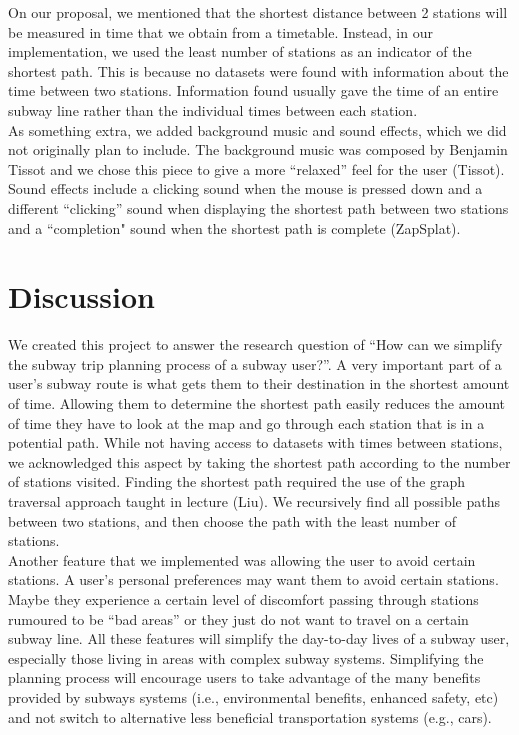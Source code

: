 \documentclass[fontsize=11pt]{article}
\begin{document}
On our proposal, we mentioned that the shortest distance between 2 stations will be measured in time that we obtain from a timetable. Instead, in our implementation, we used the least number of stations as an indicator of the shortest path. This is because no datasets were found with information about the time between two stations. Information found usually gave the time of an entire subway line rather than the individual times between each station. \\

As something extra, we added background music and sound effects, which we did not originally plan to include. The background music was composed by Benjamin Tissot and we chose this piece to give a more ``relaxed” feel for the user (Tissot). Sound effects include a clicking sound when the mouse is pressed down and a different ``clicking” sound when displaying the shortest path between two stations and a ``completion" sound when the shortest path is complete (ZapSplat).

\bigskip

\section*{Discussion} 

We created this project to answer the research question of “How can we simplify the subway trip planning process of a subway user?”. A very important part of a user’s subway route is what gets them to their destination in the shortest amount of time. Allowing them to determine the shortest path easily reduces the amount of time they have to look at the map and go through each station that is in a potential path. While not having access to datasets with times between stations, we acknowledged this aspect by taking the shortest path according to the number of stations visited. Finding the shortest path required the use of the graph traversal approach taught in lecture (Liu). We recursively find all possible paths between two stations, and then choose the path with the least number of stations.  \\

Another feature that we implemented was allowing the user to avoid certain stations. A user’s personal preferences may want them to avoid certain stations. Maybe they experience a certain level of discomfort passing through stations rumoured to be ``bad areas” or they just do not want to travel on a certain subway line.  All these features will simplify the day-to-day lives of a subway user, especially those living in areas with complex subway systems. Simplifying the planning process will encourage users to take advantage of the many benefits provided by subways systems (i.e., environmental benefits, enhanced safety, etc) and not switch to alternative less beneficial transportation systems (e.g., cars). \\
\end{document}
